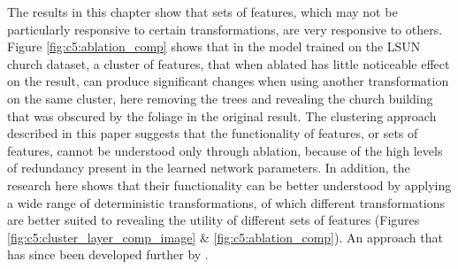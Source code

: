 The results in this chapter show that sets of features, which may not be particularly responsive to certain transformations, are very responsive to others. 
Figure \ref{fig:c5:ablation_comp} shows that in the model trained on the LSUN church dataset, a cluster of features, that when ablated has little noticeable effect on the result, can produce significant changes when using another transformation on the same cluster, here removing the trees and revealing the church building that was obscured by the foliage in the original result. 
The clustering approach described in this paper suggests that the functionality of features, or sets of features, cannot be understood only through ablation, because of the high levels of redundancy present in the learned network parameters. 
In addition, the research here shows that their functionality can be better understood by applying a wide range of deterministic transformations, of which different transformations are better suited to revealing the utility of different sets of features (Figures \ref{fig:c5:cluster_layer_comp_image} \& \ref{fig:c5:ablation_comp}). 
An approach that has since been developed further by \cite{oldfield2022panda,oldfield2024bilinear}.

